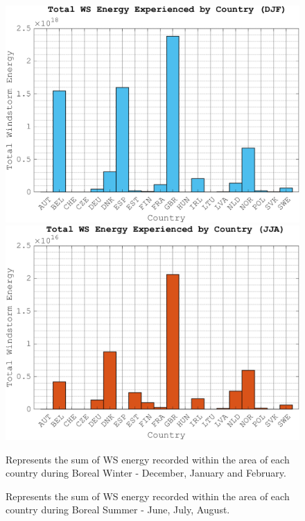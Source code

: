         \begin{figure}[ht]
            \begin{minipage}[t]{0.59\textwidth}
                \includegraphics[width=\textwidth]{figures/Total Energy of WS DJF.png}
                \includegraphics[width=\textwidth]{figures/Total Energy of WS JJA.png}
            \end{minipage}
            \hfill  %
            \begin{minipage}[t]{0.4\textwidth}
                \vspace*{-190pt}  %
                \caption{Represents the sum of WS energy recorded within the area of each country during Boreal Winter - December, January and February.}
                \label{fig:DJF_Tot_Eng_by_cunt}
                \vspace*{140pt}  %
                \caption{Represents the sum of WS energy recorded within the area of each country during Boreal Summer - June, July, August.}
                \label{fig:JJA_Tot_Eng_by_cunt}
            \end{minipage}
        \end{figure}
